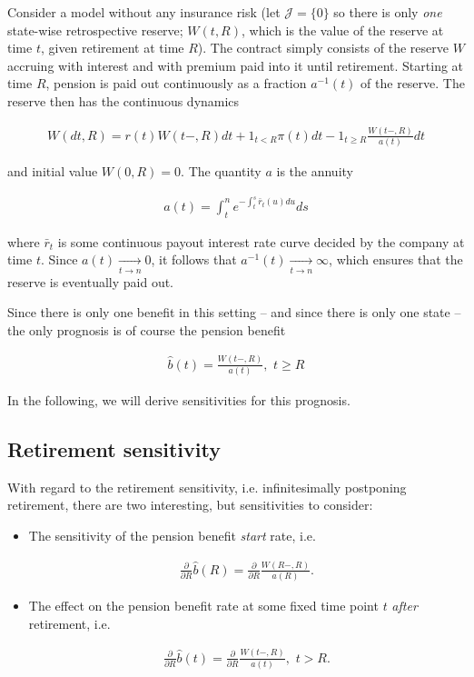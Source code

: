 \documentclass{book}
\newcommand{\1}[1]{\mathbbm{1}_{\left\lbrace #1 \right\rbrace}}
\theoremstyle{break}
\theoremstyle{remark}
\numberwithin{equation}{section}
\begin{document}
Consider a model without any insurance risk (let $\mathcal{J} = \{ 0 \}$ so there is only \textit{one} state-wise retrospective reserve; $W(t,R)$, which is the value of the reserve at time $t$, given retirement at time $R$). The contract simply consists of the reserve $W$ accruing with interest and with premium paid into it until retirement. Starting at time $R$, pension is paid out continuously as a fraction $a^{-1}(t)$ of the reserve. The reserve then has the continuous dynamics

\begin{align} \label{ReserveDE}
	W(dt,R) = r(t) W(t-,R) dt + 1_{t<R} \pi(t) dt - 1_{t \geq R} \frac{W(t-,R)}{a(t)} dt
\end{align}

and initial value $W(0,R)=0$. The quantity $a$ is the annuity

\begin{align*}
	a(t) = \int_t^n e^{-\int_t^s \bar{r}_t(u) du} ds
\end{align*}

where $\bar{r}_t$ is some continuous payout interest rate curve decided by the company at time $t$. Since $a(t) \underset{t \to n}{\longrightarrow} 0$, it follows that $a^{-1}(t) \underset{t \to n}{\longrightarrow} \infty$, which ensures that the reserve is eventually paid out.

Since there is only one benefit in this setting -- and since there is only one state -- the only prognosis is of course the pension benefit

\begin{align*}
	\hat{b}(t) = \frac{W(t-,R)}{a(t)}, \, \, t \geq R
\end{align*}

In the following, we will derive sensitivities for this prognosis.

\subsection{Retirement sensitivity}

With regard to the retirement sensitivity, i.e. infinitesimally postponing retirement, there are two interesting, but sensitivities to consider:

\begin{itemize}
	\item The sensitivity of the pension benefit \textit{start} rate, i.e.
	
	\begin{align} \label{StartPens}
		\frac{\partial}{\partial R} \hat{b}(R) = \frac{\partial}{\partial R} \frac{W(R-,R)}{a(R)}.
	\end{align}

	\item The effect on the pension benefit rate at some fixed time point $t$ \textit{after} retirement, i.e.
	
	\begin{align} \label{LaterPens}
		\frac{\partial}{\partial R} \hat{b}(t) = \frac{\partial}{\partial R} \frac{W(t-,R)}{a(t)}, \, \, t > R.
	\end{align}
	
\end{itemize}
\end{document}
